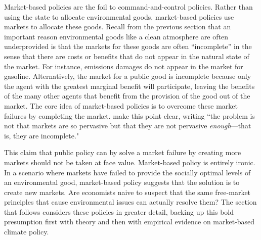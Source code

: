 Market-based policies are the foil to command-and-control policies. Rather than using the state to allocate environmental goods, market-based policies use markets to allocate these goods. Recall from the previous section that an important reason environmental goods like a clean atmosphere are often underprovided is that the markets for these goods are often ``incomplete'' in the sense that there are costs or benefits that do not appear in the natural state of the market. For instance, emissions damages do not appear in the market for gasoline. Alternatively, the market for a public good is incomplete because only the agent with the greatest marginal benefit will participate, leaving the benefits of the many other agents that benefit from the provision of the good out of the market. The core idea of market-based policies is to overcome these market failures by completing the market. \cite{keohane2016markets} make this point clear, writing ``the problem is not that markets are so pervasive but that they are not pervasive \emph{enough}---that is, they are incomplete." 

This claim that public policy can by solve a market failure by creating more markets should not be taken at face value. Market-based policy is entirely ironic. In a scenario where markets have failed to provide the socially optimal levels of an environmental good, market-based policy suggests that the solution is to create new markets. Are economists naive to suspect that the same free-market principles that cause environmental issues can actually resolve them? The section that follows considers these policies in greater detail, backing up this bold presumption first with theory and then with empirical evidence on market-based climate policy. 

